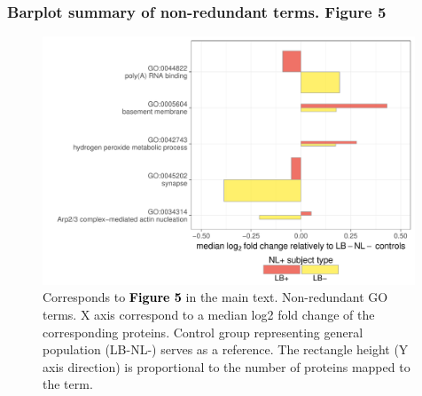\documentclass[11pt]{article}\usepackage[]{graphicx}\usepackage[usenames,dvipsnames]{color}
\newenvironment{knitrout}{}{} %
\begin{document}
\clearpage





\subsubsection{Barplot summary of non-redundant terms. Figure 5}

\begin{figure}[h!]
\center
\begin{minipage}{0.8\textwidth}
\begin{knitrout}
\color{fgcolor}

{\centering \includegraphics[width=0.99\textwidth]{figure/figure5_barplot-1} 

}



\end{knitrout}
\caption{Corresponds to
\textcolor{black}{\colorbox{highlighter}{\textbf{Figure 5}}} in the main text.
Non-redundant GO terms. X axis correspond to a median log2 fold change of the corresponding proteins. Control group representing general population (LB-NL-) serves as a reference. The rectangle height (Y axis direction) is proportional to the number of proteins mapped to the term.
}
\label{fig:GObar}
\end{minipage}
\end{figure}
\end{document}
